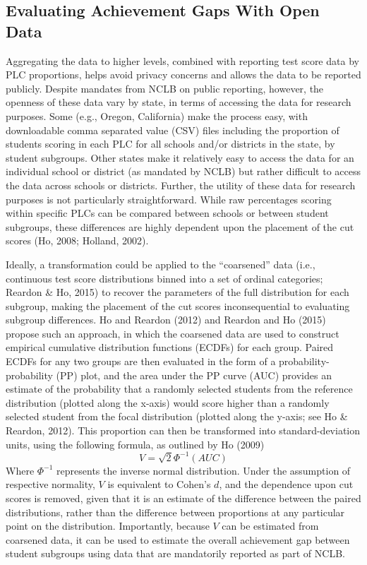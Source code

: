 \documentclass[man, fleqn, noextraspace]{apa6}
\theoremstyle{definition}
\theoremstyle{definition}
\theoremstyle{definition}
\theoremstyle{remark}
\begin{document}
\hypertarget{evaluating-achievement-gaps-with-open-data}{%
\subsection{Evaluating Achievement Gaps With Open
Data}\label{evaluating-achievement-gaps-with-open-data}}

Aggregating the data to higher levels, combined with reporting test
score data by PLC proportions, helps avoid privacy concerns and allows
the data to be reported publicly. Despite mandates from NCLB on public
reporting, however, the openness of these data vary by state, in terms
of accessing the data for research purposes. Some (e.g., Oregon,
California) make the process easy, with downloadable comma separated
value (CSV) files including the proportion of students scoring in each
PLC for all schools and/or districts in the state, by student subgroups.
Other states make it relatively easy to access the data for an
individual school or district (as mandated by NCLB) but rather difficult
to access the data across schools or districts. Further, the utility of
these data for research purposes is not particularly straightforward.
While raw percentages scoring within specific PLCs can be compared
between schools or between student subgroups, these differences are
highly dependent upon the placement of the cut scores (Ho, 2008;
Holland, 2002).

Ideally, a transformation could be applied to the \enquote{coarsened}
data (i.e., continuous test score distributions binned into a set of
ordinal categories; Reardon \& Ho, 2015) to recover the parameters of
the full distribution for each subgroup, making the placement of the cut
scores inconsequential to evaluating subgroup differences. Ho and
Reardon (2012) and Reardon and Ho (2015) propose such an approach, in
which the coarsened data are used to construct empirical cumulative
distribution functions (ECDFs) for each group. Paired ECDFs for any two
groups are then evaluated in the form of a probability-probability (PP)
plot, and the area under the PP curve (AUC) provides an estimate of the
probability that a randomly selected students from the reference
distribution (plotted along the x-axis) would score higher than a
randomly selected student from the focal distribution (plotted along the
y-axis; see Ho \& Reardon, 2012). This proportion can then be
transformed into standard-deviation units, using the following formula,
as outlined by Ho (2009) \begin{equation}
V = \sqrt{2}\Phi^{-1}(AUC)
\end{equation} Where \(\Phi^{-1}\) represents the inverse normal
distribution. Under the assumption of respective normality, \(V\) is
equivalent to Cohen's \(d\), and the dependence upon cut scores is
removed, given that it is an estimate of the difference between the
paired distributions, rather than the difference between proportions at
any particular point on the distribution. Importantly, because \(V\) can
be estimated from coarsened data, it can be used to estimate the overall
achievement gap between student subgroups using data that are
mandatorily reported as part of NCLB.
\end{document}
